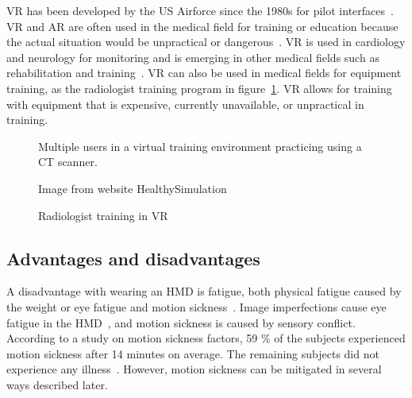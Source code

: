 \documentclass[a4paper]{report}
\begin{document}
VR has been developed by the US Airforce since the 1980s for pilot interfaces~\cite{mertz_virtual_2019}. VR and AR are often used in the medical field for training or education because the actual situation would be unpractical or dangerous~\cite{freina_immersive_2015}.
VR is used in cardiology and neurology for monitoring and is emerging in other medical fields such as rehabilitation and training~\cite{javaid_virtual_2020}.
VR can also be used in medical fields for equipment training, as the radiologist training program in figure~\ref{training}. VR allows for training with equipment that is expensive, currently unavailable, or unpractical in training.

\begin{figure}[h!]
    \centering
	\hfill
  \caption{Radiologist training in VR}
  \label{training}
  \small
Multiple users in a virtual training environment practicing using a CT scanner.

Image from website HealthySimulation~\cite{noauthor_how_2020}
\end{figure}


\subsection{Advantages and disadvantages}
A disadvantage with wearing an HMD is fatigue, both physical fatigue caused by the weight or eye fatigue and motion sickness~\cite{merhi_motion_2007}.
Image imperfections cause eye fatigue in the HMD~\cite{kooi_visual_2004}, and motion sickness is caused by sensory conflict.
According to a study on motion sickness factors, 59 \% of the subjects experienced motion sickness after 14 minutes on average. The remaining subjects did not experience any illness~\cite{kooi_visual_2004}. However, motion sickness can be mitigated in several ways described later.
\end{document}
